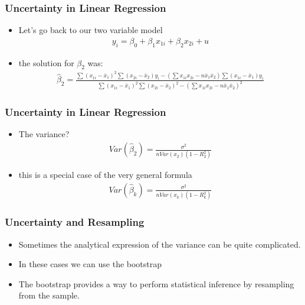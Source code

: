 \documentclass[
  shownotes,
  xcolor={svgnames},
  hyperref={colorlinks,citecolor=DarkBlue,linkcolor=andesred,urlcolor=DarkBlue}
  , aspectratio=169]{beamer}
\begin{document}
\begin{frame}
\frametitle{ Uncertainty in Linear Regression}

\begin{itemize}
  \item Let's go back to our two variable model
  \medskip 
  \begin{align}
    y_{i}=\beta_{0}+\beta_{1}x_{1i}+\beta_{2}x_{2i}+u
  \end{align}
  \item the solution for $\beta_2$ was:
  \medskip
  \begin{align}
\hat{\beta}_{2}=\frac{\sum(x_{1i}-\bar{x}_{1})^{2}\sum(x_{2i}-\bar{x}_{2})y_{i}-\left( \sum x_{1i}x_{2i}-n\bar{x}_{1}\bar{x}_{2} \right)\sum(x_{1i}-\bar{x}_{1})y_{i}}{\sum(x_{1i}-\bar{x}_{1})^{2}\sum(x_{2i}-\bar{x}_{2})^{2}-\left( \sum x_{1i}x_{2i}-n\bar{x}_{1}\bar{x}_{2}\right)^{2}}
\end{align}
\end{itemize}

\end{frame}
\begin{frame}
\frametitle{ Uncertainty in Linear Regression}
\begin{itemize}
  \item The variance?
  \medskip
  \begin{align}
    Var(\hat{\beta}_{2})=\frac{\sigma^2}{n Var(x_2)(1-R^2_2)}
  \end{align}
   \medskip
   \item this is a special case of the very general formula
  \begin{align}
    Var(\hat{\beta}_{k})=\frac{\sigma^2}{n Var(x_k)(1-R^2_k)}
  \end{align}
  
\end{itemize}


\end{frame}
\begin{frame}
\frametitle{ Uncertainty and Resampling }

\begin{itemize}
\item Sometimes the analytical expression of the variance can be quite complicated.
\medskip
\item In these cases we can use the bootstrap
\medskip
\item The bootstrap provides a way to perform statistical inference by resampling from the sample.
\end{itemize}
\end{frame}
\end{document}
